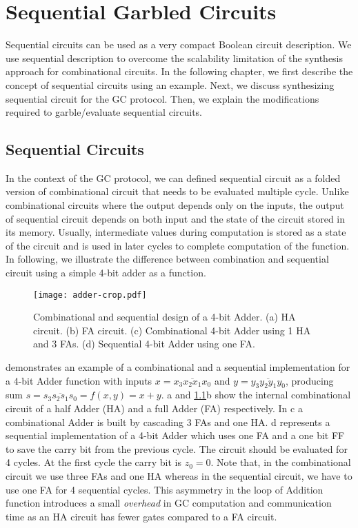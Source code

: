 \chapter{Sequential Garbled Circuits}\label{ch:seq}
Sequential circuits can be used as a very compact Boolean circuit description. We use sequential description to overcome the scalability limitation of the synthesis approach for combinational circuits.
In the following chapter, we first describe the concept of sequential circuits using an example.
Next, we discuss synthesizing sequential circuit for the GC protocol.
Then, we explain the modifications required to garble/evaluate sequential circuits.

\section{Sequential Circuits}
In the context of the GC protocol, we can defined sequential circuit as a folded version of combinational circuit that needs to be evaluated multiple cycle.
Unlike combinational circuits where the output depends only on the inputs, the output of sequential circuit depends on both input and the state of the circuit stored in its memory.
Usually, intermediate values during computation is stored as a state of the circuit and is used in later cycles to complete computation of the function.
In following, we illustrate the difference between combination and sequential circuit using a simple 4-bit adder as a function.

\begin{figure}[ht]
    \centering
    \texttt{[image: adder-crop.pdf]}
    \caption{Combinational and sequential design of a 4-bit Adder.
  (a) HA circuit.
  (b) FA circuit.
  (c) Combinational 4-bit Adder using 1 HA and 3 FAs.
  (d) Sequential 4-bit Adder using one FA.}\label{fig:combSeq}
\end{figure}

 demonstrates an example of a combinational and a sequential implementation for a 4-bit Adder function with inputs $x = \overline{x_3x_2x_1x_0}$ and $y = \overline{y_3y_2y_1y_0}$, producing sum $s  = \overline{s_3s_2s_1s_0} = f(x, y) = x + y$.
a and \ref{fig:combSeq}b show the internal combinational circuit of a half Adder (HA) and a full Adder (FA) respectively.
In c a combinational Adder is built by cascading 3 FAs and one HA.
d represents a sequential implementation of a 4-bit Adder which uses one FA and a one bit FF to save the carry bit from the previous cycle.
The circuit should be evaluated for 4 cycles.
At the first cycle the carry bit is $z_0=0$.
Note that, in the combinational circuit we use three FAs and one HA whereas in the sequential circuit, we have to use one FA for 4 sequential cycles.
This asymmetry in the loop of Addition function introduces a small \emph{overhead} in GC computation and communication time as an HA circuit has fewer gates compared to a FA circuit.

